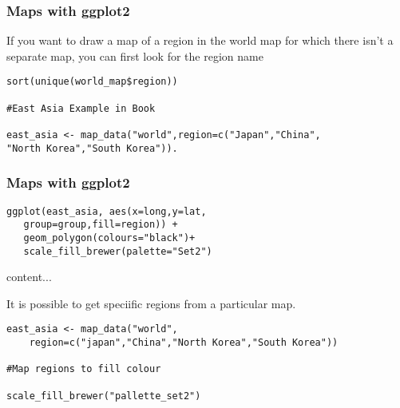 \documentclass{beamer}
\begin{document}
\begin{frame}[fragile]
\frametitle{Maps with ggplot2}
If you want to draw a map of a region in the world map for which there isn't a separate map, you can
first look for the region name

\begin{framed}
\begin{verbatim}
sort(unique(world_map$region))

#East Asia Example in Book

east_asia <- map_data("world",region=c("Japan","China",
"North Korea","South Korea")).

\end{verbatim}
\end{framed}
\end{frame}
\begin{frame}[fragile]
\frametitle{Maps with ggplot2}
\begin{framed}

\begin{verbatim}
ggplot(east_asia, aes(x=long,y=lat,
   group=group,fill=region)) + 
   geom_polygon(colours="black")+
   scale_fill_brewer(palette="Set2")
\end{verbatim}
\end{framed}
\end{frame}
\begin{frame}
content...
\end{frame}
\begin{frame}[fragile]
It is possible to get speciific regions from a particular map.

\begin{framed}
\begin{verbatim}
east_asia <- map_data("world",
    region=c("japan","China","North Korea","South Korea"))

#Map regions to fill colour

scale_fill_brewer("pallette_set2")
\end{verbatim}
\end{framed}
\end{frame}
\end{document}
